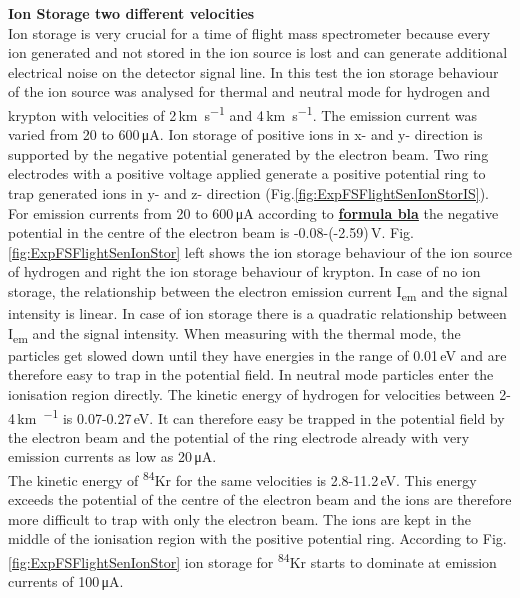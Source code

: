 		\textbf{Ion Storage two different velocities}\\ %
		Ion storage is very crucial for a time of flight mass spectrometer because every ion generated and not stored in the ion source is lost and can generate additional electrical noise on the detector signal line. In this test the ion storage behaviour of the ion source was analysed for thermal and neutral mode for hydrogen and krypton with velocities of 2\,\si{\kilo\meter\per\second} and 4\,\si{\kilo\meter\per\second}. The emission current was varied from 20 to 600\,\si{\micro\ampere}. Ion storage of positive ions in x- and y- direction is supported by the negative potential generated by the electron beam. Two ring electrodes with a positive voltage applied generate a positive potential ring to trap generated ions in y- and z- direction (Fig.\ref{fig:ExpFSFlightSenIonStorIS}). For emission currents from 20 to 600\,\si{\micro\ampere} according to \underline{\textbf{formula bla}} the negative potential in the centre of the electron beam is -0.08-(-2.59)\,\si{\volt}. %
		Fig.\ref{fig:ExpFSFlightSenIonStor} left shows the ion storage behaviour of the ion source of hydrogen and right the ion storage behaviour of krypton. In case of no ion storage, the relationship between the electron emission current I\textsubscript{em} and the signal intensity is linear. In case of ion storage there is a quadratic relationship between I\textsubscript{em} and the signal intensity. When measuring with the thermal mode, the particles get slowed down until they have energies in the range of 0.01\,\si{\electronvolt} and are therefore easy to trap in the potential field. In neutral mode particles enter the ionisation region directly. The kinetic energy of hydrogen for velocities between 2-4\,\si{\kilo\metre\per\sec} is 0.07-0.27\,\si{\electronvolt}. It can therefore easy be trapped in the potential field by the electron beam and the potential of the ring electrode already with very emission currents as low as 20\,\si{\micro\ampere}.\\
		The kinetic energy of \textsuperscript{84}Kr for the same velocities is 2.8-11.2\,\si{\electronvolt}. This energy exceeds the potential of the centre of the electron beam and the ions are therefore more difficult to trap with only the electron beam. The ions are kept in the middle of the ionisation region with the positive potential ring. According to Fig.\,\ref{fig:ExpFSFlightSenIonStor} ion storage for \textsuperscript{84}Kr starts to dominate at emission currents of 100\,\si{\micro\ampere}.
